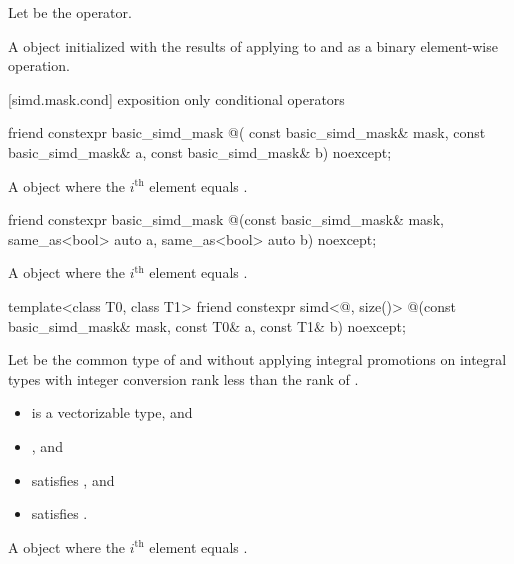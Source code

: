 \begin{itemdescr}
  \pnum Let \op{} be the operator.

  \pnum\returns
  A  object initialized with the results of applying \op{}
  to  and  as a binary element-wise operation.
\end{itemdescr}

[simd.mask.cond]{ exposition only conditional operators}

\begin{itemdecl}
friend constexpr basic_simd_mask @\simdselect@(
  const basic_simd_mask& mask, const basic_simd_mask& a, const basic_simd_mask& b) noexcept;
\end{itemdecl}

\begin{itemdescr}
  \pnum\returns
  A  object where the $i^\text{th}$ element equals  \foralli.
\end{itemdescr}

\begin{itemdecl}
friend constexpr basic_simd_mask
@\simdselect@(const basic_simd_mask& mask, same_as<bool> auto a, same_as<bool> auto b) noexcept;
\end{itemdecl}

\begin{itemdescr}
  \pnum\returns
  A  object where the $i^\text{th}$ element equals 
  \foralli.
\end{itemdescr}

\begin{itemdecl}
template<class T0, class T1>
  friend constexpr simd<@\seebelow@, size()>
    @\simdselect@(const basic_simd_mask& mask, const T0& a, const T1& b) noexcept;
\end{itemdecl}

\begin{itemdescr}
  \pnum Let  be the common type of  and  without
  applying integral promotions on integral types with integer conversion rank
  less than the rank of .

  \pnum\constraints
  \begin{itemize}
    \item {} is a vectorizable type, and
    \item {}, and
    \item {} satisfies , and
    \item {} satisfies .
  \end{itemize}

  \pnum\returns
  A  object where the $i^\text{th}$ element equals  \foralli.
\end{itemdescr}


